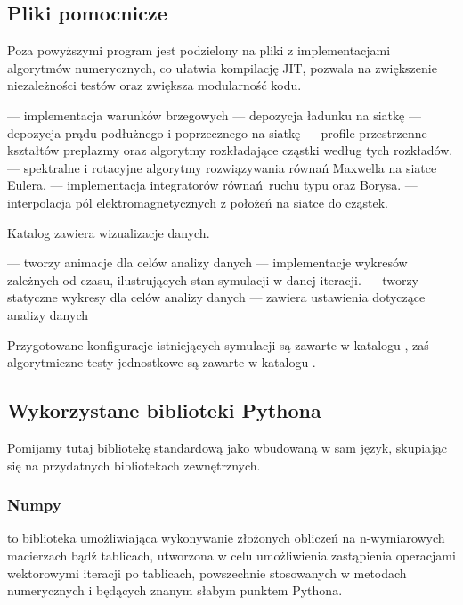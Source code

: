 \subsection{Pliki pomocnicze}
Poza powyższymi program jest podzielony na pliki z implementacjami algorytmów numerycznych,
co ułatwia kompilację JIT, pozwala na zwiększenie niezależności testów oraz
zwiększa modularność kodu.
\begin{itemize}
    \itemi{}  --- implementacja warunków brzegowych
    \itemi{}  --- depozycja ładunku na siatkę
    \itemi{}  --- depozycja prądu podłużnego i poprzecznego na siatkę
    \itemi{}  --- profile przestrzenne kształtów preplazmy
        oraz algorytmy rozkładające cząstki według tych rozkładów.
    \itemi{}  --- spektralne i rotacyjne algorytmy rozwiązywania równań Maxwella na siatce Eulera.
    \itemi{}  --- implementacja integratorów równań ruchu typu  oraz Borysa.
    \itemi{}  --- interpolacja pól elektromagnetycznych z położeń na siatce do cząstek.
\end{itemize}

Katalog  zawiera wizualizacje danych.
\begin{itemize}
    \itemi{}  --- tworzy animacje dla celów analizy danych
    \itemi{}  --- implementacje wykresów zależnych od czasu, ilustrujących stan symulacji w danej iteracji.
    \itemi{}  --- tworzy statyczne wykresy dla celów analizy danych
    \itemi{}  --- zawiera ustawienia dotyczące analizy danych
\end{itemize}

Przygotowane konfiguracje istniejących symulacji są zawarte w katalogu 
, zaś algorytmiczne testy jednostkowe są zawarte w katalogu .

\subsection{Wykorzystane biblioteki Pythona}

Pomijamy tutaj bibliotekę standardową jako wbudowaną w sam język, skupiając się na przydatnych bibliotekach zewnętrznych.

\subsubsection{Numpy}
\cite{numpy} to biblioteka umożliwiająca wykonywanie złożonych obliczeń na
n-wymiarowych macierzach bądź tablicach, utworzona w celu umożliwienia
zastąpienia operacjami wektorowymi iteracji po tablicach, powszechnie
stosowanych w metodach numerycznych i będących znanym słabym punktem
Pythona.

